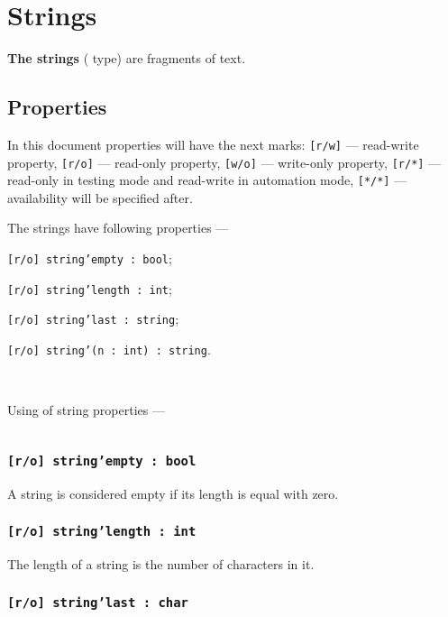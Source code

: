 \section{Strings}

{\bf The strings} (\str{} type) are fragments of text.

\subsection{Properties}

In this document properties will have the next marks: \texttt{[r/w]} — read-write property, \texttt{[r/o]} — read-only property, \texttt{[w/o]} — write-only property,  \texttt{[r/*]} — read-only in testing mode and read-write in automation mode, \texttt{[*/*]} — availability will be specified after.

The strings have following properties —
\begin{icItems}
\item
	\texttt{[r/o] string'empty : bool};
\item
	\texttt{[r/o] string'length : int};
\item
	\texttt{[r/o] string'last : string};
\item
	\texttt{[r/o] string'(n : int) : string}.
\end{icItems}

\ 

Using of string properties —
\inputminted[linenos]{icl}{../sources/stringprop.icL}

\subsubsection{\texttt{[r/o] string'empty : bool}}

A string is considered empty if its length is equal with zero.

\subsubsection{\texttt{[r/o] string'length : int}}

The length of a string is the number of characters in it.

\subsubsection{\texttt{[r/o] string'last : char}}

